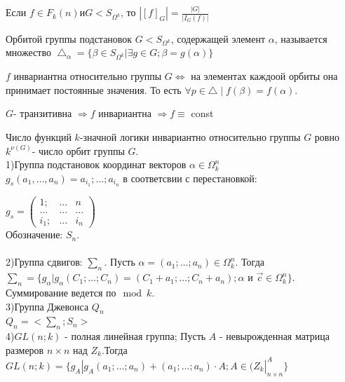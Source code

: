 \thr 
Если $f\in F_k(n) и G<S_{\Omega^k}$, то $|[f]_G|=\frac{|G|}{|I_G(f)|}$

\opr 
Орбитой группы подстановок $G<S_{\Omega^k}$, содержащей элемент $\alpha$, называется множество $\bigtriangleup_\alpha = \{ \beta \in S_{\Omega^k}|\exists g\in G;\beta =g(\alpha)\}$


\utv
$f$ инвариантна относительно группы $G \Leftrightarrow$ на элементах каждоой орбиты она принимает постоянные значения. То есть $\forall p \in \bigtriangleup \mid f(\beta) = f(\alpha)$.

\conseq
$G$- транзитивна $\Rightarrow f$ инвариантна $\Rightarrow f \equiv$ const

\conseq
Число функций $k$-значной логики инвариантно относительно группы $G$ ровно $k^{\nu(G)}$- число орбит группы $G$.\\

1)Группа подстановок координат векторов $\alpha \in \Omega_k^n $\\
$g_s(a_1, \dots , a_n)  =  a_{i_1};\dots ;a_{i_n}$ в соответсвии с перестановкой: 

$g_s=
\begin{pmatrix}
  1;& \dots & n\\
  \dots & \dots & \dots\\
  i_1; & \dots & i_n
  
  
\end{pmatrix}$\\

Обозначение: $ S_n $.\\\\

2)Группа сдвигов: $ \sum_n $. Пусть $ \alpha = (a_1;\dots;a_n) \in \Omega_k^n $. Тогда $ \sum_n = \{g_\alpha|g_\alpha(C_1;\dots;C_n)=(C_1+a_1;\dots;C_n+a_n);\alpha$ и $\vec{c} \in \Omega_k^n\} $. 
Суммирование ведется по$ \mod k$.\\

3)Группа Джевонса $Q_n$\\
$Q_n = < \sum_n;S_n>$\\

4)$GL(n;k)$ - полная линейная группа; Пусть $A$ - невырожденная матрица размеров $n \times n $ над $ Z_k$.Тогда $GL(n;k)=\{g_A|g_A(a_1;\dots;a_n)+(a_1;\dots;a_n)\cdotp A; A \in (Z_k|_{n \times n}^A\}$\\

